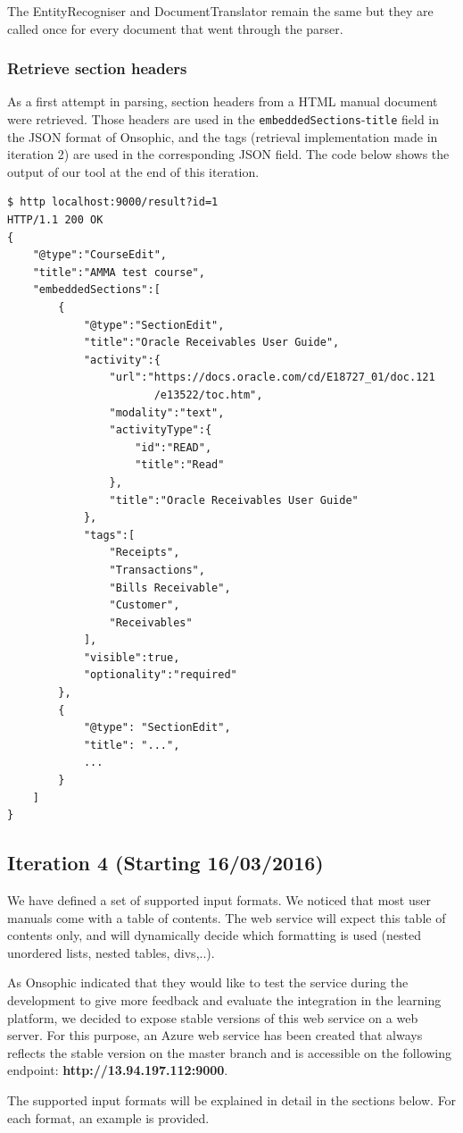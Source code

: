\documentclass[a4paper,12pt]{article}
\begin{document}
The EntityRecogniser and DocumentTranslator remain the same but they are called once for every document that went through the parser.

\subsubsection*{Retrieve section headers}
As a first attempt in parsing, section headers from a HTML manual document were retrieved. Those headers are used in the \verb|embeddedSections|-\verb|title| field in the JSON format of Onsophic, and the tags (retrieval implementation made in iteration 2) are used in the corresponding JSON field. The code below shows the output of our tool at the end of this iteration.
\begin{lstlisting}
$ http localhost:9000/result?id=1
HTTP/1.1 200 OK
{
    "@type":"CourseEdit",
    "title":"AMMA test course",
    "embeddedSections":[
        {
            "@type":"SectionEdit",
            "title":"Oracle Receivables User Guide",
            "activity":{
                "url":"https://docs.oracle.com/cd/E18727_01/doc.121
                       /e13522/toc.htm",
                "modality":"text",
                "activityType":{
                    "id":"READ",
                    "title":"Read"
                },
                "title":"Oracle Receivables User Guide"
            },
            "tags":[
                "Receipts",
                "Transactions",
                "Bills Receivable",
                "Customer",
                "Receivables"
            ],
            "visible":true,
            "optionality":"required"
        },
        {
            "@type": "SectionEdit",
            "title": "...",
            ...
        }
    ]
}
\end{lstlisting}

\subsection*{Iteration 4 (Starting 16/03/2016)}
We have defined a set of supported input formats. We noticed that most user manuals come with a table of contents. The web service will expect this table of contents only, and will dynamically decide which formatting is used (nested unordered lists, nested tables, divs,..). 
\par
As Onsophic indicated that they would like to test the service during the development to give more feedback and evaluate the integration in the learning platform, we decided to expose stable versions of this web service on a web server. For this purpose, an Azure web service has been created that always reflects the stable version on the master branch and is accessible on the following endpoint: \textbf{http://13.94.197.112:9000}.
\par
The supported input formats will be explained in detail in the sections below. For each format, an example is provided.
\end{document}
